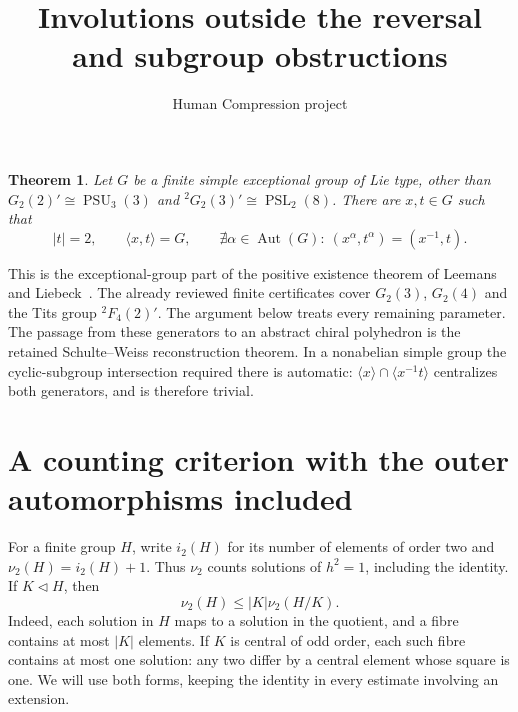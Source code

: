\documentclass[10pt,a4paper]{article}
\title{Involutions outside the reversal and subgroup obstructions}
\author{Human Compression project}\date{}
\newtheorem{theorem}{Theorem}\newtheorem{lemma}[theorem]{Lemma}
\newcommand{\Aut}{\operatorname{Aut}}
\newcommand{\PSL}{\operatorname{PSL}}\newcommand{\PGL}{\operatorname{PGL}}
\newcommand{\nuu}{\nu_2}
\begin{document}
\maketitle

\begin{theorem}\label{main}
Let $G$ be a finite simple exceptional group of Lie type, other than
$G_2(2)'\cong\operatorname{PSU}_3(3)$ and
${}^2G_2(3)'\cong\PSL_2(8)$. There are $x,t\in G$ such that
\[
 |t|=2,\qquad \langle x,t\rangle=G,
 \qquad \nexists\alpha\in\Aut(G):\ (x^\alpha,t^\alpha)=(x^{-1},t).
\]
\end{theorem}

This is the exceptional-group part of the positive existence theorem
of Leemans and Liebeck~\cite{LL}. The already reviewed finite certificates
cover $G_2(3)$, $G_2(4)$ and the Tits group ${}^2F_4(2)'$.
The argument below treats every remaining parameter.
The passage from these generators to an abstract chiral polyhedron is
the retained Schulte--Weiss reconstruction theorem. In a nonabelian simple
group the cyclic-subgroup intersection required there is automatic:
$\langle x\rangle\cap\langle x^{-1}t\rangle$ centralizes both generators,
and is therefore trivial.

\section{A counting criterion with the outer automorphisms included}

For a finite group $H$, write $i_2(H)$ for its number of elements of
order two and $\nuu(H)=i_2(H)+1$. Thus $\nuu$ counts solutions of $h^2=1$,
including the identity. If $K\lhd H$, then
\begin{equation}\label{extension}
 \nuu(H)\le |K|\nuu(H/K).
\end{equation}
Indeed, each solution in $H$ maps to a solution in the quotient, and a
fibre contains at most $|K|$ elements. If $K$ is central of odd order, each
such fibre contains at most one solution: any two differ by a central
element whose square is one. We will use both forms, keeping the identity
in every estimate involving an extension.
\end{document}

